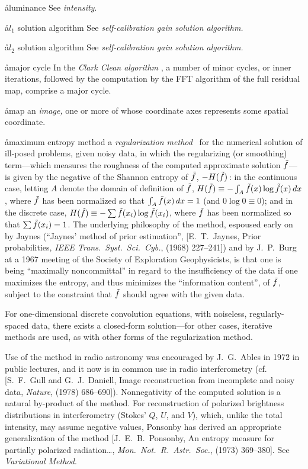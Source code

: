 \aa{luminance} See {\it intensity}.

\aa{$l_1$ solution algorithm} See
{\it self-calibration gain solution algorithm.}

\aa{$l_2$ solution algorithm} See
{\it self-calibration gain solution algorithm.}

\aa{major cycle}
In the {\it Clark Clean algorithm} \qv, a number of minor cycles,
or inner iterations, followed by the computation by the FFT
algorithm of the full residual map, comprise a major cycle.

\aa{map}
an {\it image,} one or more of whose coordinate axes
represents some spatial coordinate.

\aa{maximum entropy method}
a {\it regularization method} \qv\ for the numerical solution
of ill-posed problems, given noisy data, in which the regularizing
(or smoothing) term---which measures the roughness of the
computed approximate solution $\tilde f$---%
is given by the negative of the Shannon entropy of $\tilde f$, $-H(\tilde f)$\,:
in the continuous case, letting $A$ denote the domain of
definition of $\tilde f$,
$H(\tilde f)\equiv -\int_A \tilde f(x)\log \tilde f(x)\,dx$,
where $\tilde f$ has been normalized so that $\int_A \tilde f(x)\,dx=1$
(and $0\log0\equiv0$);
and in the discrete case, $H(\tilde f)\equiv -\sum \tilde f(x_i)\log \tilde f(x_i)$,
where $\tilde f$ has been normalized so that $\sum \tilde f(x_i)=1$.
The underlying philosophy of the method,
espoused early on by Jaynes
(``Jaynes' method of prior estimation'', [E.~T.~Jaynes,
Prior probabilities, {\it IEEE Trans.\ Syst.\ Sci.\ Cyb.},
 (1968) 227--241]) and by J.~P.~Burg at a 1967
meeting of the Society of Exploration Geophysicists,
is that one is being ``maximally noncommittal'' in regard to
the insufficiency of the data if one maximizes the entropy,
and thus minimizes the ``information content'', of $\tilde f$,
subject to the constraint that $\tilde f$ should agree with the
given data.
\par
For one-dimensional discrete convolution equations, with
noiseless, regularly-spaced data, there exists a closed-form
solution---for other cases, iterative methods are used, as
with other forms of the regularization method.
\par
Use of the method in radio astronomy was encouraged
by J.~G.~Ables in 1972 in public lectures,
and it now is in common use in radio interferometry
(cf. [S.~F.~Gull and G.~J.~Daniell, Image reconstruction from
incomplete and noisy data, {\it Nature},  (1978)
686--690]).
Nonnegativity of the computed solution is a natural by-product
of the method.
For reconstruction of polarized brightness distributions
in interferometry (Stokes' $Q$, $U$, and $V$),
which, unlike the total intensity, may assume negative values,
Ponsonby has derived an appropriate generalization of the method
[J.~E.~B.~Ponsonby, An entropy measure for partially polarized
radiation\dots, {\it Mon.\ Not.\ R.\ Astr.\ Soc.},  (1973)
369--380].
See {\it Variational Method}.

